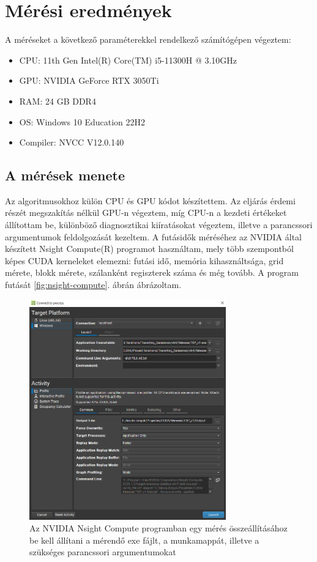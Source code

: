 \chapter{Mérési eredmények} \label{resultsChapter}

A méréseket a következő paraméterekkel rendelkező számítógépen végeztem:
\begin{itemize}
	\item	CPU: 11th Gen Intel(R) Core(TM) i5-11300H @ 3.10GHz
	\item	GPU: NVIDIA GeForce RTX 3050Ti 
	\item	RAM: 24 GB DDR4 
	\item	OS: Windows 10 Education 22H2 
	\item	Compiler: NVCC V12.0.140
	
\end{itemize}

\section{A mérések menete}
Az algoritmusokhoz külön CPU és GPU kódot készítettem. Az eljárás érdemi részét megszakítás nélkül GPU-n végeztem, míg CPU-n a kezdeti értékeket állítottam be, különböző diagnosztikai kiíratásokat végeztem, illetve a parancssori argumentumok feldolgozását kezeltem. A futásidők méréséhez az NVIDIA által készített Nsight Compute(R) programot használtam, mely több szempontból képes CUDA kerneleket elemezni: futási idő, memória kihasználtsága, grid mérete, blokk mérete, szálanként regiszterek száma és még tovább. A program futását \ref{fig:nsight-compute}. ábrán ábrázoltam. 

\begin{figure}[ht!]
	\centering
	\includegraphics[width=85mm, keepaspectratio]{figures/nsight-compute-config.png}
	\caption{Az NVIDIA Nsight Compute programban egy mérés összeállításához be kell állítani a mérendő exe fájlt, a munkamappát, illetve a szükséges parancssori argumentumokat}
	\label{fig:nsight-compute-config}
\end{figure}

